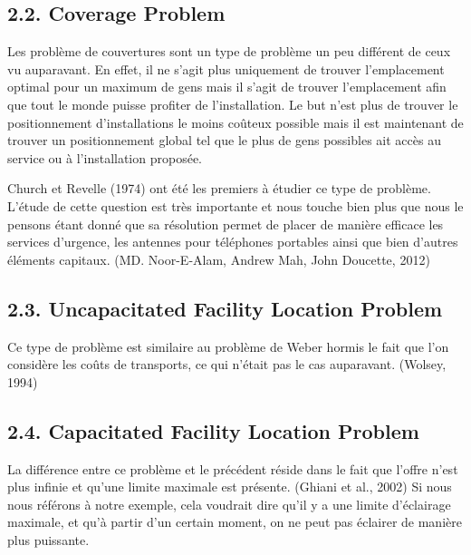 \subsection*{2.2. Coverage Problem}

\bigskip

Les problème de couvertures sont un type de problème un peu différent de ceux vu auparavant. En effet, il ne s'agit plus uniquement de trouver l'emplacement optimal pour un maximum de gens mais il s'agit de trouver l'emplacement afin que tout le monde puisse profiter de l'installation. Le but n'est plus de trouver le positionnement d'installations le moins coûteux possible mais il est maintenant de trouver un positionnement global tel que le plus de gens possibles ait accès au service ou à l'installation proposée.

\bigskip

Church et Revelle (1974) ont été les premiers à étudier ce type de problème. L'étude de cette question est très importante et nous touche bien plus que nous le pensons étant donné que sa résolution permet de placer de manière efficace les services d'urgence, les antennes pour téléphones portables ainsi que bien d'autres éléments capitaux. (MD. Noor-E-Alam, Andrew Mah, John Doucette, 2012)

\subsection*{2.3. Uncapacitated Facility Location Problem}

\bigskip

Ce type de problème est similaire au problème de Weber hormis le fait que l'on considère les coûts de transports, ce qui n'était pas le cas auparavant. (Wolsey, 1994) 

\subsection*{2.4. Capacitated Facility Location Problem}

\bigskip

La différence entre ce problème et le précédent réside dans le fait que l'offre n'est plus infinie et qu'une limite maximale est présente. (Ghiani et al., 2002) Si nous nous référons à notre exemple, cela voudrait dire qu'il y a une limite d'éclairage maximale, et qu'à partir d'un certain moment, on ne peut pas éclairer de manière plus puissante.

\clearpage


